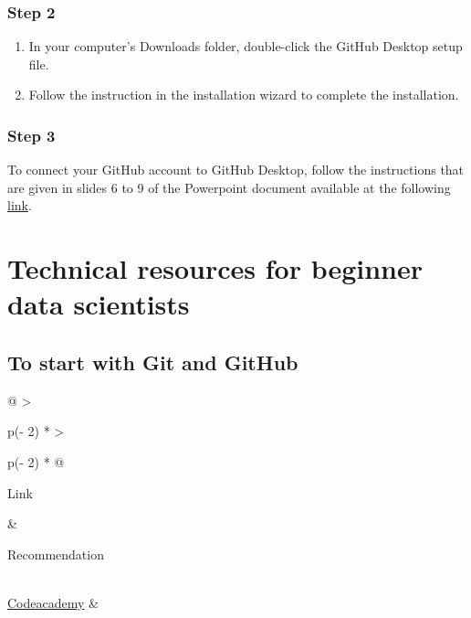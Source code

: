 \documentclass[
  letterpaper,
  DIV=11,
  numbers=noendperiod,
  oneside]{scrreprt}
\providecommand{\tightlist}{%
  \setlength{\itemsep}{0pt}\setlength{\parskip}{0pt}}\usepackage{longtable,booktabs,array}
\begin{document}
\subsection{Step 2}

\begin{enumerate}
\def\labelenumi{\arabic{enumi}.}
\tightlist
\item
  In your computer's Downloads folder, double-click the GitHub Desktop
  setup file.
\item
  Follow the instruction in the installation wizard to complete the
  installation.
\end{enumerate}

\subsection{Step 3}

To connect your GitHub account to GitHub Desktop, follow the
instructions that are given in slides 6 to 9 of the Powerpoint document
available at the following
\href{https://drive.switch.ch/index.php/s/1eFnksrX0UtjfZV}{link}.

\hypertarget{sec-useful-resources}{%
\chapter{Technical resources for beginner data
scientists}\label{sec-useful-resources}}

\hypertarget{sec-resources-git}{%
\section{To start with Git and GitHub}\label{sec-resources-git}}

\begin{longtable}[]{@{}
  >{\raggedright\arraybackslash}p{(\columnwidth - 2\tabcolsep) * }
  >{\raggedright\arraybackslash}p{(\columnwidth - 2\tabcolsep) * }@{}}
\toprule\noalign{}
\begin{minipage}[b]{\linewidth}\raggedright
Link
\end{minipage} & \begin{minipage}[b]{\linewidth}\raggedright
Recommendation
\end{minipage} \\
\midrule\noalign{}
\endhead
\bottomrule\noalign{}
\endlastfoot
\href{https://www.codecademy.com/learn/learn-git}{Codeacademy} & \\
\end{longtable}
\end{document}
